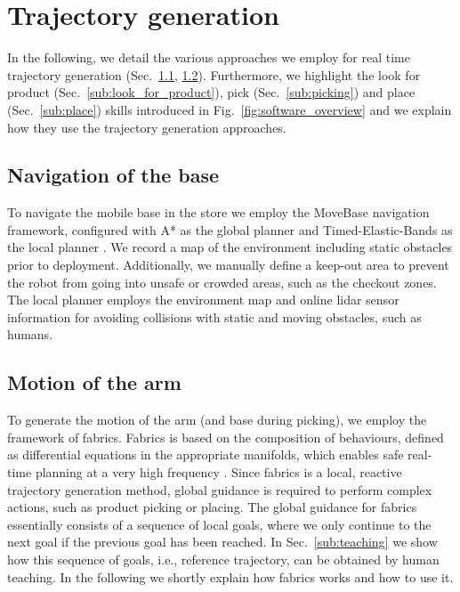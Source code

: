 \section{Trajectory generation}
\label{sec:trajectory_generation}


In the following, we detail the various approaches we employ for real time trajectory generation (Sec.~\ref{sub:base_motion}, \ref{sub:arm_motion}). Furthermore, we highlight the look for product (Sec.~\ref{sub:look_for_product}), pick (Sec.~\ref{sub:picking}) and place (Sec.~\ref{sub:place}) skills introduced in Fig.~\ref{fig:software_overview} and we explain how they use the trajectory generation approaches. %

\subsection{Navigation of the base}
\label{sub:base_motion}
To navigate the mobile base in the store we employ the MoveBase navigation framework, configured with A* as the global planner and Timed-Elastic-Bands as the local planner \cite{rosmann2017integrated}.
We record a map of the environment including static obstacles prior to deployment.
Additionally, we manually define a keep-out
area to prevent the robot from going into unsafe or crowded areas, such as the checkout zones. The local planner employs the environment map and online lidar sensor information for avoiding collisions with static and moving obstacles, such as humans.

\subsection{Motion of the arm}
\label{sub:arm_motion}
To generate the motion of the arm (and base during picking), we employ the framework of \ac{fabrics}.
Fabrics is based on the composition of behaviours, defined
as differential equations in the appropriate manifolds,
which enables safe real-time planning at a very high
frequency
\cite{ratliff2023fabrics,van2022geometric,Spahn2023}. Since
\ac{fabrics} is a local, reactive trajectory generation
method, global guidance is required to perform complex
actions, such as product picking or placing. 
The global guidance for fabrics essentially consists of a sequence of local goals, where we only continue to the next goal if the previous goal has been reached. In Sec.~\ref{sub:teaching} we show how this sequence of goals, i.e., reference trajectory, can be obtained by human teaching. In the following we shortly explain how \ac{fabrics} works and how to use it.



